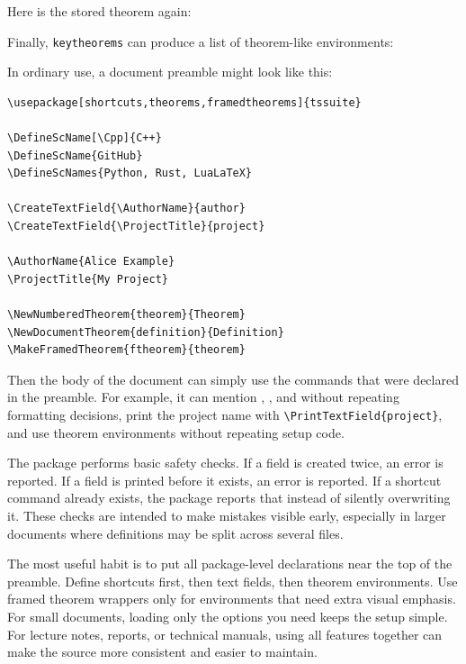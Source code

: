 \documentclass[a4paper,11pt]{article}
\newcommand{\pkg}[1]{\texttt{#1}}
\begin{document}
Here is the stored theorem again:


Finally, \pkg{keytheorems} can produce a list of theorem-like environments:

\listofkeytheorems[title={Theorems appearing in this example}]



In ordinary use, a document preamble might look like this:

\begin{verbatim}
\usepackage[shortcuts,theorems,framedtheorems]{tssuite}

\DefineScName[\Cpp]{C++}
\DefineScName{GitHub}
\DefineScNames{Python, Rust, LuaLaTeX}

\CreateTextField{\AuthorName}{author}
\CreateTextField{\ProjectTitle}{project}

\AuthorName{Alice Example}
\ProjectTitle{My Project}

\NewNumberedTheorem{theorem}{Theorem}
\NewDocumentTheorem{definition}{Definition}
\MakeFramedTheorem{ftheorem}{theorem}
\end{verbatim}

Then the body of the document can simply use the commands that were declared in
the preamble.  For example, it can mention \Cpp, \GitHub, and \Python without
repeating formatting decisions, print the project name with
\verb|\PrintTextField{project}|, and use theorem environments without repeating
setup code.

The package performs basic safety checks.  If a field is created twice, an error
is reported.  If a field is printed before it exists, an error is reported.  If
a shortcut command already exists, the package reports that instead of silently
overwriting it.  These checks are intended to make mistakes visible early,
especially in larger documents where definitions may be split across several
files.

The most useful habit is to put all package-level declarations near the top of
the preamble.  Define shortcuts first, then text fields, then theorem
environments.  Use framed theorem wrappers only for environments that need extra
visual emphasis.  For small documents, loading only the options you need keeps
the setup simple.  For lecture notes, reports, or technical manuals, using all
features together can make the source more consistent and easier to maintain.
\end{document}
